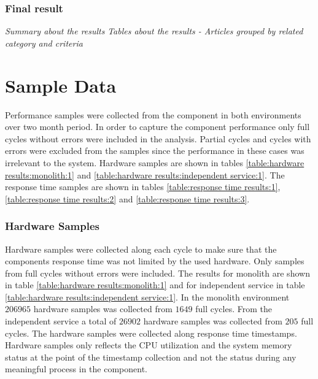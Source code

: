 \subsubsection{Final result}
\textit{Summary about the results}
\textit{Tables about the results - Articles grouped by related category and criteria}

\section{Sample Data}
Performance samples were collected from the component in both environments over two month period.
In order to capture the component performance only full cycles without errors were included in the analysis.
Partial cycles and cycles with errors were excluded from the samples since the performance in these cases was irrelevant to the system.
Hardware samples are shown in tables \ref{table:hardware results:monolith:1} and \ref{table:hardware results:independent service:1}.
The response time samples are shown in tables \ref{table:response time results:1}, \ref{table:response time results:2} and \ref{table:response time results:3}.

\subsubsection{Hardware Samples}
Hardware samples were collected along each cycle to make sure that the components response time was not limited by the used hardware.
Only samples from full cycles without errors were included.
The results for monolith are shown in table \ref{table:hardware results:monolith:1} and for independent service in table \ref{table:hardware results:independent service:1}.
In the monolith environment $206965$ hardware samples was collected from $1649$ full cycles.
From the independent service a total of $26902$ hardware samples was collected from $205$ full cycles.
The hardware samples were collected along response time timestamps.
Hardware samples only reflects the CPU utilization and the system memory status at the point of the timestamp collection and not the status during any meaningful process in the component.

